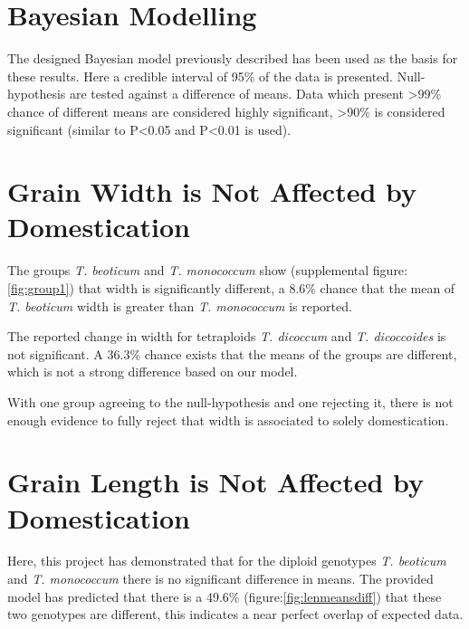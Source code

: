 \documentclass[11pt]{report}
\begin{document}
\section{Bayesian Modelling}
\label{sec:orgd2d8b87}
The designed Bayesian model previously described has been used as the basis for these results. Here a credible interval of 95\% of the data is presented. Null-hypothesis are tested against a difference of means. Data which present >99\% chance of different means are considered highly significant, >90\% is considered significant (similar to P<0.05 and P<0.01 is used).


\section{Grain Width is Not Affected by Domestication}
\label{sec:org8f18d07}

The groups \emph{T. beoticum} and \emph{T. monococcum} show (supplemental figure:\ref{fig:group1}) that width is significantly different, a 8.6\% chance that the mean of \emph{T. beoticum} width is greater than \emph{T. monococcum} is reported.

The reported change in width for tetraploids \emph{T. dicoccum} and \emph{T. dicoccoides} is not significant. A 36.3\% chance exists that the means of the groups are different, which is not a strong difference based on our model.

With one group agreeing to the null-hypothesis and one rejecting it, there is not enough evidence to fully reject that width is associated to solely domestication.

\clearpage
\section{Grain Length is Not Affected by Domestication}
\label{sec:org31ac5cc}

Here, this project has demonstrated that for the diploid genotypes \emph{T. beoticum} and \emph{T. monococcum} there is no significant difference in means. The provided model has predicted that there is a 49.6\% (figure:\ref{fig:lenmeansdiff}) that these two genotypes are different, this indicates a near perfect overlap of expected data.
\end{document}
